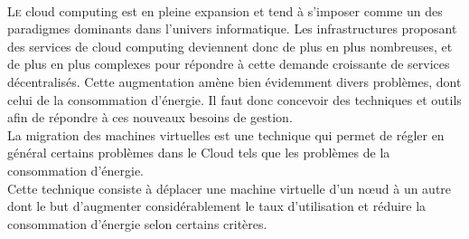\thispagestyle{empty}
\begin{center}
\\
\end{center}
\vspace{20mm}

\begin{onehalfspace}
\lettrine[nindent=1em,lines=3]{L}e cloud computing est en pleine expansion et tend à s'imposer comme un des paradigmes dominants dans l'univers informatique. Les infrastructures proposant des services de cloud computing deviennent donc de plus en plus nombreuses, et de plus en plus complexes pour répondre à cette demande croissante de services décentralisés. Cette augmentation amène bien évidemment divers problèmes, dont celui de la consommation d'énergie. Il faut donc concevoir des techniques et outils afin de répondre à ces nouveaux besoins de gestion.\\

La migration des machines virtuelles est une technique qui permet de régler en général certains problèmes dans le Cloud tels que les problèmes de la consommation d'énergie.\\

Cette technique consiste à déplacer une machine virtuelle d'un nœud à un autre dont le but d'augmenter considérablement le taux d'utilisation et réduire la consommation d'énergie selon certains critères.\\


\end{onehalfspace}
